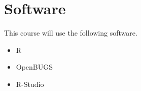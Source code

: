 \chapter{Software}

This course will use the following software.

\begin{itemize}
\item R
\item OpenBUGS
\item R-Studio
\end{itemize}
